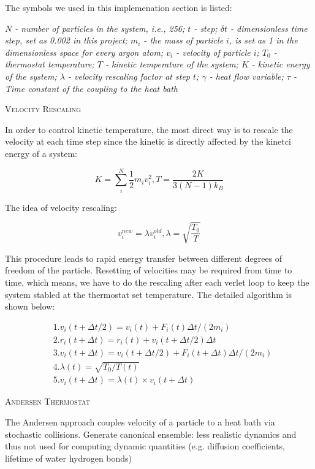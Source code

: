 \documentclass{article}
\begin{document}
\begin{spacing}{1}
The symbols we used in this implemenation section is listed:

{\it $N$ - number of particles in the system, i.e., 256; $t$ -  step; $\delta t$ - dimensionless time step, set as 0.002 in this project; $m_i$ - the mass of particle $i$, is set as 1 in the dimensionless space for every argon atom; $v_i$ - velocity of particle $i$; $T_0$ - thermostat temperature; $T$ - kinetic temperature of the system; $K$ - kinetic energy of the system; $\lambda$ - velocity rescaling factor at step $t$; $\gamma$ - heat flow variable; $\tau$ - Time constant of the coupling to the heat bath}

\vspace{1.5em}
\textsc{\Large Velocity Rescaling}

In order to control kinetic temperature, the most direct way is to rescale the velocity at each time step since the kinetic is directly affected by the kinetci energy of a system:

$$K=\sum_i^N \frac{1}{2}m_iv_i^2, T=\frac{2K}{3(N-1)k_B}$$

The idea of velocity rescaling:

$$v_i^{new}=\lambda v_i^{old}, \lambda=\sqrt{\frac{T_0}{T}}$$

This procedure leads to rapid energy transfer between different degrees of freedom of the particle. Resetting of velocities may be required from time to time, which means, we have to do the rescaling after each verlet loop to keep the system stabled at the thermostat set temperature. The detailed algorithm is shown below:

$$\begin{aligned} 
& 1. v_{i}(t+\Delta t/2)=v_{i}(t)+F_{i}(t)\Delta t/(2m_i) \\ 
& 2. r_{i}(t+\Delta t)=r_{i}(t)+v_{i}(t+\Delta t/2)\Delta t \\ 
& 3. v_{i}(t+\Delta t)=v_{i}(t+\Delta t/2)+F_{i}(t+\Delta t)\Delta t/(2m_i) \\
& 4. \lambda(t)=\sqrt{T_0/T(t)} \\
& 5. v_{i}(t+\Delta t)=\lambda(t) \times v_{i}(t+\Delta t)
\end{aligned}$$

\vspace{1.5em}
\textsc{\Large Andersen Thermostat}

The Andersen approach couples velocity of a particle to a heat bath via stochastic collisions. Generate canonical ensemble: less realistic dynamics and thus not used for computing dynamic quantities (e.g. diffusion coefficients, lifetime of water hydrogen bonds)


\end{spacing}
\end{document}
